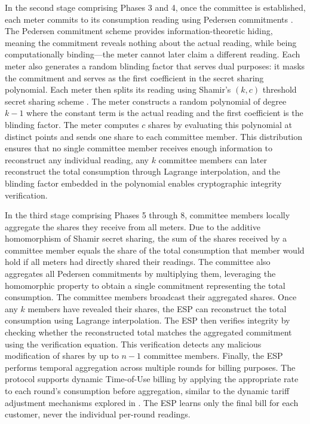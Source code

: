 \documentclass[conference]{IEEEtran}
\begin{document}
In the second stage comprising Phases 3 and 4, once the committee is established, each meter commits to its consumption reading using Pedersen commitments \cite{pedersen1991non}. The Pedersen commitment scheme provides information-theoretic hiding, meaning the commitment reveals nothing about the actual reading, while being computationally binding—the meter cannot later claim a different reading. Each meter also generates a random blinding factor that serves dual purposes: it masks the commitment and serves as the first coefficient in the secret sharing polynomial. Each meter then splits its reading using Shamir's $(k,c)$ threshold secret sharing scheme \cite{shamir1979how}. The meter constructs a random polynomial of degree $k-1$ where the constant term is the actual reading and the first coefficient is the blinding factor. The meter computes $c$ shares by evaluating this polynomial at distinct points and sends one share to each committee member. This distribution ensures that no single committee member receives enough information to reconstruct any individual reading, any $k$ committee members can later reconstruct the total consumption through Lagrange interpolation, and the blinding factor embedded in the polynomial enables cryptographic integrity verification.

In the third stage comprising Phases 5 through 8, committee members locally aggregate the shares they receive from all meters. Due to the additive homomorphism of Shamir secret sharing, the sum of the shares received by a committee member equals the share of the total consumption that member would hold if all meters had directly shared their readings. The committee also aggregates all Pedersen commitments by multiplying them, leveraging the homomorphic property to obtain a single commitment representing the total consumption. The committee members broadcast their aggregated shares. Once any $k$ members have revealed their shares, the ESP can reconstruct the total consumption using Lagrange interpolation. The ESP then verifies integrity by checking whether the reconstructed total matches the aggregated commitment using the verification equation. This verification detects any malicious modification of shares by up to $n-1$ committee members. Finally, the ESP performs temporal aggregation across multiple rounds for billing purposes. The protocol supports dynamic Time-of-Use billing by applying the appropriate rate to each round's consumption before aggregation, similar to the dynamic tariff adjustment mechanisms explored in \cite{zaredar2024lightweight}. The ESP learns only the final bill for each customer, never the individual per-round readings.
\end{document}
